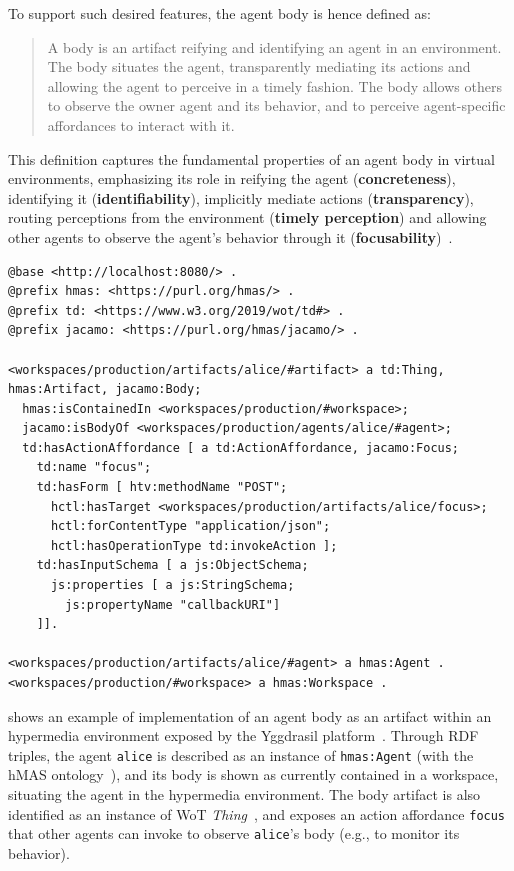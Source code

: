 To support such desired features, the agent body is hence defined as:
\begin{quotation}
A body is an artifact reifying and identifying an agent in an environment. The body situates the agent, transparently mediating its actions and allowing the agent to perceive in a timely fashion.
The body allows others to observe the owner agent and its behavior, and to perceive agent-specific affordances to interact with it.
\end{quotation}

This definition captures the fundamental properties of an agent body in virtual environments, emphasizing its role in reifying the agent (\textbf{concreteness}), identifying it (\textbf{identifiability}), implicitly mediate actions (\textbf{transparency}), routing perceptions from the environment (\textbf{timely perception}) and allowing other agents to observe the agent's behavior through it (\textbf{focusability})~\cite{embodiment2025}.

\begin{code}
\label{lst:agent-description}
\begin{verbatim}
@base <http://localhost:8080/> .
@prefix hmas: <https://purl.org/hmas/> .
@prefix td: <https://www.w3.org/2019/wot/td#> .
@prefix jacamo: <https://purl.org/hmas/jacamo/> .

<workspaces/production/artifacts/alice/#artifact> a td:Thing, hmas:Artifact, jacamo:Body;
  hmas:isContainedIn <workspaces/production/#workspace>;
  jacamo:isBodyOf <workspaces/production/agents/alice/#agent>;
  td:hasActionAffordance [ a td:ActionAffordance, jacamo:Focus;
    td:name "focus";
    td:hasForm [ htv:methodName "POST";
      hctl:hasTarget <workspaces/production/artifacts/alice/focus>;
      hctl:forContentType "application/json";
      hctl:hasOperationType td:invokeAction ];
    td:hasInputSchema [ a js:ObjectSchema;
      js:properties [ a js:StringSchema;
        js:propertyName "callbackURI"]
    ]].

<workspaces/production/artifacts/alice/#agent> a hmas:Agent .
<workspaces/production/#workspace> a hmas:Workspace .
\end{verbatim}
\end{code}

 shows an example of implementation of an agent body as an artifact within an hypermedia environment exposed by the Yggdrasil platform~\cite{Ciortea_Boissier_Ricci_2019}.
%
Through \ac{RDF} triples, the agent \texttt{alice} is described as an instance of \texttt{hmas:Agent} (with the \ac{hMAS} ontology~\cite{hmas-core}), and its body is shown as currently contained in a workspace, situating the agent in the hypermedia environment.
%
The body artifact is also identified as an instance of \ac{WoT} \emph{Thing}~\cite{wot-td}, and exposes an action affordance \texttt{focus} that other agents can invoke to observe \texttt{alice}'s body (e.g., to monitor its behavior).

